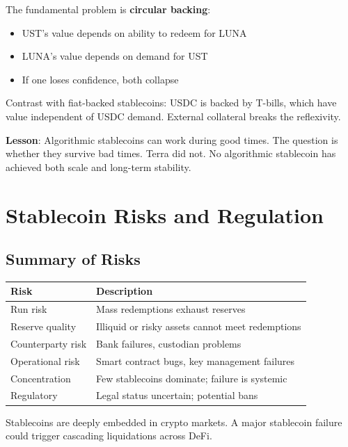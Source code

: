 \documentclass[11pt,a4paper]{article}
\newcommand{\keyword}[1]{\textbf{\textcolor{AccentOrange}{#1}}}
\begin{document}
The fundamental problem is \keyword{circular backing}:
\begin{itemize}
    \item UST's value depends on ability to redeem for LUNA
    \item LUNA's value depends on demand for UST
    \item If one loses confidence, both collapse
\end{itemize}

Contrast with fiat-backed stablecoins: USDC is backed by T-bills, which have value independent of USDC demand. External collateral breaks the reflexivity.

\textbf{Lesson}: Algorithmic stablecoins can work during good times. The question is whether they survive bad times. Terra did not. No algorithmic stablecoin has achieved both scale and long-term stability.

\section{Stablecoin Risks and Regulation}

\subsection{Summary of Risks}

\begin{center}
\begin{tabular}{lp{8cm}}
\toprule
\textbf{Risk} & \textbf{Description} \\
\midrule
Run risk & Mass redemptions exhaust reserves \\
Reserve quality & Illiquid or risky assets cannot meet redemptions \\
Counterparty risk & Bank failures, custodian problems \\
Operational risk & Smart contract bugs, key management failures \\
Concentration & Few stablecoins dominate; failure is systemic \\
Regulatory & Legal status uncertain; potential bans \\
\bottomrule
\end{tabular}
\end{center}

Stablecoins are deeply embedded in crypto markets. A major stablecoin failure could trigger cascading liquidations across DeFi.
\end{document}
